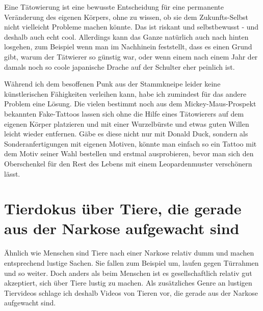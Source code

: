 \documentclass[a5paper,pagesize,10pt,bibtotoc,pointlessnumbers,normalheadings,DIV=9,twoside=false]{scrbook}
\begin{document}
Eine Tätowierung ist eine bewusste Entscheidung für eine permanente Veränderung des eigenen Körpers, ohne zu wissen, ob sie dem Zukunfts-Selbst nicht vielleicht Probleme machen könnte.
Das ist riskant und selbstbewusst - und deshalb auch echt cool.
Allerdings kann das Ganze natürlich auch nach hinten losgehen, zum Beispiel wenn man im Nachhinein feststellt, dass es einen Grund gibt, warum der Tätwierer so günstig war, oder wenn einem nach einem Jahr der damals noch so coole japanische Drache auf der Schulter eher peinlich ist.

Während ich dem besoffenen Punk aus der Stammkneipe leider keine künstlerischen Fähigkeiten verleihen kann, habe ich zumindest für das andere Problem eine Lösung.
Die vielen bestimmt noch aus dem Mickey-Maus-Prospekt bekannten Fake-Tattoos lassen sich ohne die Hilfe eines Tätowierers auf dem eigenen Körper platzieren und mit einer Wurzelbürste und etwas guten Willen leicht wieder entfernen.
Gäbe es diese nicht nur mit Donald Duck, sondern als Sonderanfertigungen mit eigenen Motiven, könnte man einfach so ein Tattoo mit dem Motiv seiner Wahl bestellen und erstmal ausprobieren, bevor man sich den Oberschenkel für den Rest des Lebens mit einem Leopardenmuster verschönern lässt.





\chapter{Tierdokus über Tiere, die gerade aus der Narkose aufgewacht sind}

Ähnlich wie Menschen sind Tiere nach einer Narkose relativ dumm und machen entsprechend lustige Sachen.
Sie fallen zum Beispiel um, laufen gegen Türrahmen und so weiter.
Doch anders als beim Menschen ist es gesellschaftlich relativ gut akzeptiert, sich über Tiere lustig zu machen.
Als zusätzliches Genre an lustigen Tiervideos schlage ich deshalb Videos von Tieren vor, die gerade aus der Narkose aufgewacht sind.
\end{document}
